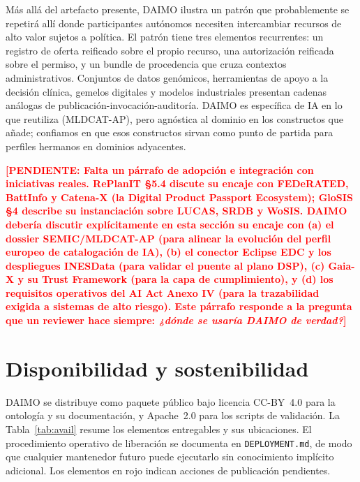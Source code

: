 \documentclass[Afour,sagev,times]{sagej}
\newcommand{\code}[1]{\texttt{#1}}
\newcommand{\TODO}[1]{\textcolor{red}{\textbf{[PENDIENTE: #1]}}}
\begin{document}
Más allá del artefacto presente, DAIMO ilustra un patrón que probablemente se repetirá allí donde participantes autónomos necesiten intercambiar recursos de alto valor sujetos a política. El patrón tiene tres elementos recurrentes: un registro de oferta reificado sobre el propio recurso, una autorización reificada sobre el permiso, y un bundle de procedencia que cruza contextos administrativos. Conjuntos de datos genómicos, herramientas de apoyo a la decisión clínica, gemelos digitales y modelos industriales presentan cadenas análogas de publicación-invocación-auditoría. DAIMO es específica de IA en lo que reutiliza (MLDCAT-AP), pero agnóstica al dominio en los constructos que añade; confiamos en que esos constructos sirvan como punto de partida para perfiles hermanos en dominios adyacentes.

\TODO{Falta un párrafo de adopción e integración con iniciativas reales. RePlanIT §5.4 discute su encaje con FEDeRATED, BattInfo y Catena-X (la Digital Product Passport Ecosystem); GloSIS §4 describe su instanciación sobre LUCAS, SRDB y WoSIS. DAIMO debería discutir explícitamente en esta sección su encaje con (a) el dossier SEMIC/MLDCAT-AP (para alinear la evolución del perfil europeo de catalogación de IA), (b) el conector Eclipse EDC y los despliegues INESData (para validar el puente al plano DSP), (c) Gaia-X y su Trust Framework (para la capa de cumplimiento), y (d) los requisitos operativos del AI Act Anexo IV (para la trazabilidad exigida a sistemas de alto riesgo). Este párrafo responde a la pregunta que un reviewer hace siempre: \emph{¿dónde se usaría DAIMO de verdad?}}

\section{Disponibilidad y sostenibilidad}\label{sec:avail}

DAIMO se distribuye como paquete público bajo licencia CC-BY~4.0 para la ontología y su documentación, y Apache~2.0 para los scripts de validación. La Tabla~\ref{tab:avail} resume los elementos entregables y sus ubicaciones. El procedimiento operativo de liberación se documenta en \code{DEPLOYMENT.md}, de modo que cualquier mantenedor futuro puede ejecutarlo sin conocimiento implícito adicional. Los elementos en rojo indican acciones de publicación pendientes.
\end{document}

